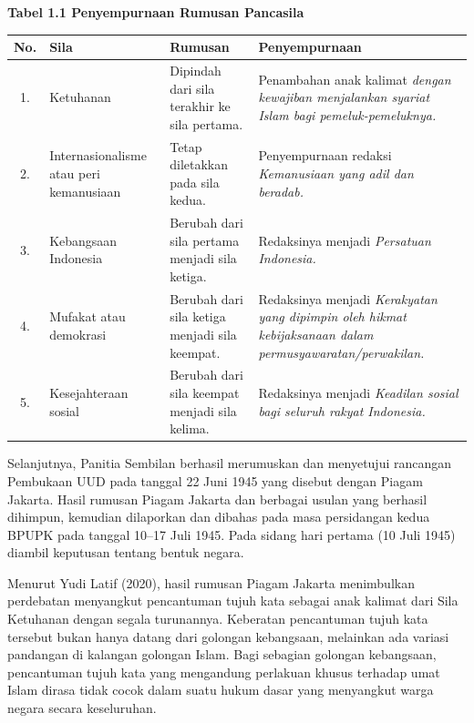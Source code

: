 \documentclass[12pt,a4paper]{article}
\begin{document}
\vspace{0.5cm}
\textbf{Tabel 1.1 Penyempurnaan Rumusan Pancasila}
\vspace{0.2cm}

\begin{tabularx}{\textwidth}{|c|p{3.5cm}|X|X|}
\hline
\textbf{No.} & \textbf{Sila} & \textbf{Rumusan} & \textbf{Penyempurnaan} \\
\hline
1. & Ketuhanan & Dipindah dari sila terakhir ke sila pertama. & Penambahan anak kalimat \textit{dengan kewajiban menjalankan syariat Islam bagi pemeluk-pemeluknya.} \\
\hline
2. & Internasionalisme atau peri kemanusiaan & Tetap diletakkan pada sila kedua. & Penyempurnaan redaksi \textit{Kemanusiaan yang adil dan beradab.} \\
\hline
3. & Kebangsaan Indonesia & Berubah dari sila pertama menjadi sila ketiga. & Redaksinya menjadi \textit{Persatuan Indonesia.} \\
\hline
4. & Mufakat atau demokrasi & Berubah dari sila ketiga menjadi sila keempat. & Redaksinya menjadi \textit{Kerakyatan yang dipimpin oleh hikmat kebijaksanaan dalam permusyawaratan/perwakilan.} \\
\hline
5. & Kesejahteraan sosial & Berubah dari sila keempat menjadi sila kelima. & Redaksinya menjadi \textit{Keadilan sosial bagi seluruh rakyat Indonesia.} \\
\hline
\end{tabularx}
\vspace{0.5cm}

Selanjutnya, Panitia Sembilan berhasil merumuskan dan menyetujui rancangan Pembukaan UUD pada tanggal 22 Juni 1945 yang disebut dengan Piagam Jakarta. Hasil rumusan Piagam Jakarta dan berbagai usulan yang berhasil dihimpun, kemudian dilaporkan dan dibahas pada masa persidangan kedua BPUPK pada tanggal 10--17 Juli 1945. Pada sidang hari pertama (10 Juli 1945) diambil keputusan tentang bentuk negara.

Menurut Yudi Latif (2020), hasil rumusan Piagam Jakarta menimbulkan perdebatan menyangkut pencantuman tujuh kata sebagai anak kalimat dari Sila Ketuhanan dengan segala turunannya. Keberatan pencantuman tujuh kata tersebut bukan hanya datang dari golongan kebangsaan, melainkan ada variasi pandangan di kalangan golongan Islam. Bagi sebagian golongan kebangsaan, pencantuman tujuh kata yang mengandung perlakuan khusus terhadap umat Islam dirasa tidak cocok dalam suatu hukum dasar yang menyangkut warga negara secara keseluruhan.
\end{document}
